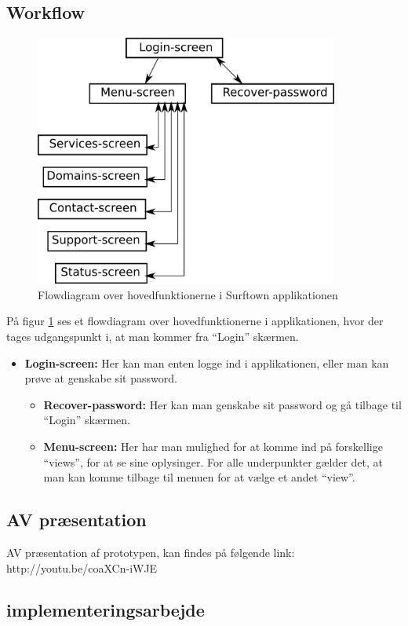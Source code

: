 \documentclass[12pt]{article}
\begin{document}
\subsection*{Workflow}
\begin{figure}[h]
	\includegraphics[width=10cm]{flow.png}
	\caption{Flowdiagram over hovedfunktionerne i Surftown applikationen}
	\label{flow}
\end{figure}
På figur \ref{flow} ses et flowdiagram over hovedfunktionerne i applikationen, hvor der tages udgangspunkt i, at man kommer fra ``Login'' skærmen.
\begin{itemize}
	\item \textbf{Login-screen: } Her kan man enten logge ind i applikationen, eller man kan prøve at genskabe sit password.
	\begin{itemize}
		\item \textbf{Recover-password: } Her kan man genskabe sit password og gå tilbage til ``Login'' skærmen.
		\item \textbf{Menu-screen: } Her har man mulighed for at komme ind på forskellige ``views'', for at se sine oplysinger. For alle underpunkter gælder det, at man kan komme tilbage til menuen for at vælge et andet ``view''.	
	\end{itemize}
\end{itemize}
\subsection{AV præsentation}
AV præsentation af prototypen, kan findes på følgende link: http://youtu.be/coaXCn-iWJE

\subsection{implementeringsarbejde}
\end{document}

